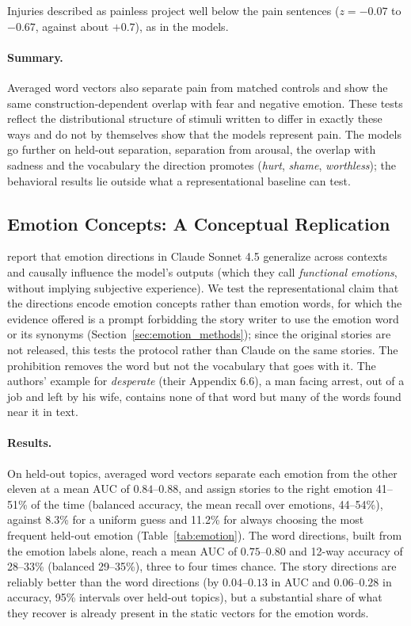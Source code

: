 \documentclass[11pt]{article}
\begin{document}
Injuries described as painless project well below the pain sentences ($z = -0.07$ to $-0.67$, against about $+0.7$), as in the models.

\paragraph{Summary.}
Averaged word vectors also separate pain from matched controls and show the same
construction-dependent overlap with fear and negative emotion. These tests reflect the
distributional structure of stimuli written to differ in exactly these ways and
do not by themselves show that the models represent pain. The models go further on held-out
separation, separation from arousal, the overlap with sadness and the vocabulary the direction
promotes (\emph{hurt}, \emph{shame}, \emph{worthless}); the
behavioral results lie outside what a representational baseline can test.

\subsection{Emotion Concepts: A Conceptual Replication}
\label{sec:emotion}

\citet{sofroniew2026emotion} report that emotion directions in Claude Sonnet 4.5 generalize
across contexts and causally influence the model's outputs (which they call \emph{functional
emotions}, without implying subjective experience). We test the representational claim that the
directions encode emotion concepts rather than emotion words, for which the evidence offered is
a prompt forbidding the story writer to use the emotion word or its synonyms
(Section~\ref{sec:emotion_methods}); since the original stories are not released, this tests
the protocol rather than Claude on the same stories. The prohibition removes the word but not the
vocabulary that goes with it. The authors' example for \emph{desperate} (their Appendix 6.6), a man facing arrest, out of a job and left by his wife, contains none of that word but many of the words found near it in text.

\paragraph{Results.}
On held-out topics, averaged word vectors separate each emotion from the other eleven at a
mean AUC of $0.84$--$0.88$, and assign stories to the right emotion 41--51\% of the time
(balanced accuracy, the mean recall over emotions, 44--54\%), against 8.3\% for a uniform
guess and 11.2\% for always choosing the most frequent held-out emotion (Table~\ref{tab:emotion}). The word directions, built from the
emotion labels alone, reach a mean AUC of $0.75$--$0.80$ and 12-way accuracy of 28--33\%
(balanced 29--35\%), three to four times chance. The story directions are reliably better than the word
directions (by $0.04$--$0.13$ in AUC and $0.06$--$0.28$ in accuracy, 95\% intervals over
held-out topics), but a substantial share of what they recover is already present in the
static vectors for the emotion words.
\end{document}
